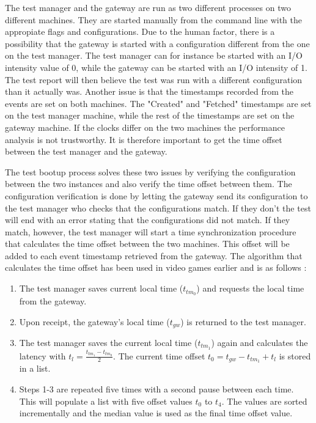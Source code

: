 The test manager and the gateway are run as two different processes on two
different machines. They are started manually from the command line with the
appropiate flags and configurations. Due to the human factor, there is a
possibility that the gateway is started with a configuration different from the
one on the test manager. The test manager can for instance be started with an
I/O intensity value of 0, while the gateway can be started with an I/O
intensity of 1. The test report will then believe the test was run with a
different configuration than it actually was. Another issue is that the
timestamps recorded from the events are set on both machines. The "Created" and
"Fetched" timestamps are set on the test manager machine, while the rest of the
timestamps are set on the gateway machine. If the clocks differ on the two
machines the performance analysis is not trustworthy. It is therefore important
to get the time offset between the test manager and the gateway.

The test bootup process solves these two issues by verifying the configuration
between the two instances and also verify the time offset between them. The
configuration verification is done by letting the gateway send its
configuration to the test manager who checks that the configurations match. If
they don't the test will end with an error stating that the configurations did
not match. If they match, however, the test manager will start a time
synchronization procedure that calculates the time offset between the two
machines. This offset will be added to each event timestamp retrieved from the
gateway. The algorithm that calculates the time offset has been used in video
games earlier and is as follows \cite{simpson2004stream}:

\begin{enumerate}
    \item The test manager saves current local time ($t_{tm_0}$) and requests the
local time from the gateway.
    \item Upon receipt, the gateway's local time ($t_{gw}$) is returned to the
test manager.
    \item The test manager saves the current local time ($t_{tm_1}$) again and
calculates the latency with $t_l = \frac{t_{tm_1} - t_{tm_0}}{2}$. The current time
offset $t_0 = t_{gw} - t_{tm_1} + t_l$ is stored in a list.
    \item Steps 1-3 are repeated five times with a second pause between each
time. This will populate a list with five offset values $t_0$ to $t_4$. The
values are sorted incrementally and the median value is used as the final
time offset value.
\end{enumerate}

